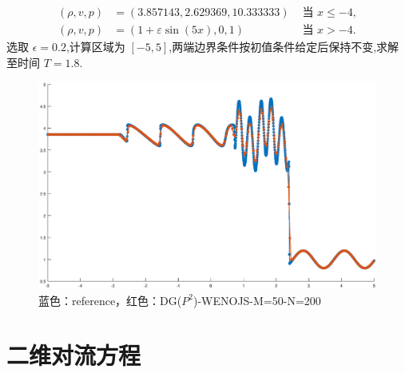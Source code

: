 \documentclass{book}
\begin{document}
\begin{example}
    \begin{equation}
        \begin{aligned}
            (\rho, v, p) & =(3.857143,2.629369,10.333333)   & \text { 当 } x \leq-4, \\
            (\rho, v, p) & =(1+\varepsilon \sin (5 x), 0,1) & \text { 当 } x>-4 .
        \end{aligned}
    \end{equation}
    选取 $\epsilon = 0.2$,计算区域为 $[-5,5]$,两端边界条件按初值条件给定后保持不变,求解至时间 $T=1.8$.
    \begin{figure}[H]
        \centering
        \label{fig:}
        \includegraphics[width=0.7\linewidth]{fig/shu_osher.eps}
        \caption{蓝色：reference，红色：DG($P^2$)-WENOJS-M=50-N=200}
    \end{figure}

\end{example}
\section{二维对流方程}
\end{document}
